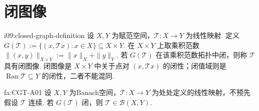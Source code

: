 \section{闭图像}\label{sec:i09-closed-graph}

\begin{FADefinition}[A][闭图像]{i09:closed-graph-definition}
设 \(\displaystyle X,Y\) 为赋范空间，\(\displaystyle \mathcal T:X\to Y\) 为线性映射. 定义
\(\displaystyle G(\mathcal T) :=\{(x,\mathcal T x):x\in X\} \subseteq X\times Y\).
在 \(\displaystyle X\times Y\) 上取乘积范数
\(\displaystyle \|(x,y)\|_{X\times Y}:=\|x\|_X+\|y\|_Y\).
若 \(\displaystyle G(\mathcal T)\) 在该乘积范数拓扑中闭，则称 \(\displaystyle \mathcal T\) 具有闭图像. 闭图像是 \(\displaystyle X\times Y\) 中关于点对 \(\displaystyle (x,\mathcal T x)\) 的闭性；闭值域则是 \(\displaystyle \operatorname{Ran}\mathcal T\subseteq Y\) 的闭性，二者不能混同.
\end{FADefinition}

\begin{FATheorem}[A][闭图像定理]{fa:CGT-A01}
设 \(\displaystyle X,Y\) 为Banach空间，\(\displaystyle \mathcal T:X\to Y\) 为处处定义的线性映射，不预先假设 \(\displaystyle \mathcal T\) 连续. 若 \(\displaystyle G(\mathcal T)\) 闭，则
\(\displaystyle \mathcal T\in\mathcal B(X,Y)\).
\end{FATheorem}

